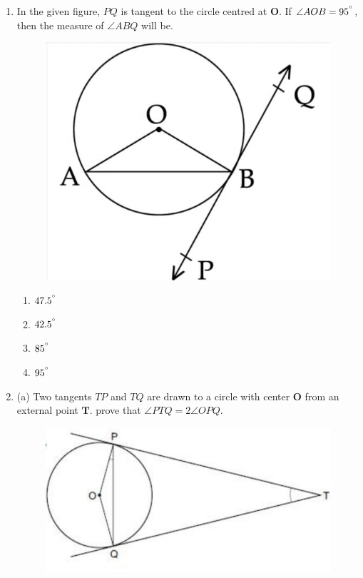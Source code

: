 \documentclass{article}
\let\vec\mathbf
\begin{document}
\begin{enumerate}
\item In the given figure, $ PQ $ is tangent to the circle centred at $ \vec{O} $. 
	If $ \angle{AOB}=95^{\degree} $, then the measure of $ \angle{ABQ} $ will be.
\begin{figure}[H]
\centering
	\includegraphics[width=\columnwidth]{fig1.jpg}
	\caption{}
	\label{fig}
\end{figure}
		\begin{enumerate}
			\item $ 47.5^{\degree} $
			\item $ 42.5^{\degree} $
			\item $ 85^{\degree} $
			\item $ 95^{\degree} $
		\end{enumerate}
	\item (a) Two tangents $ TP $ and $ TQ $ are drawn to a circle with center $ \vec{O} $ from an external 
		point $ \vec{T} $. prove that $ \angle{PTQ}=2\angle{OPQ} $.
		\begin{figure}[H]
			\centering
			\includegraphics[width=\columnwidth]{fig2.jpg}

\end{figure}
\end{enumerate}
\end{document}

